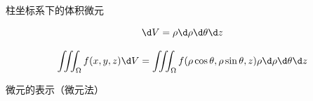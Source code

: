 柱坐标系下的体积微元

\begin{center}
	$$\d V=\rho \d\rho \d\theta \d z$$
\end{center}

$${\iiint_{\Omega}f(x,y,z)\d
V=\iiint_{\Omega}f(\rho\cos\theta,\rho\sin\theta,z)\rho 
\d\rho \d\theta \d z}$$

微元的表示（微元法）

\begin{center}
\end{center}

